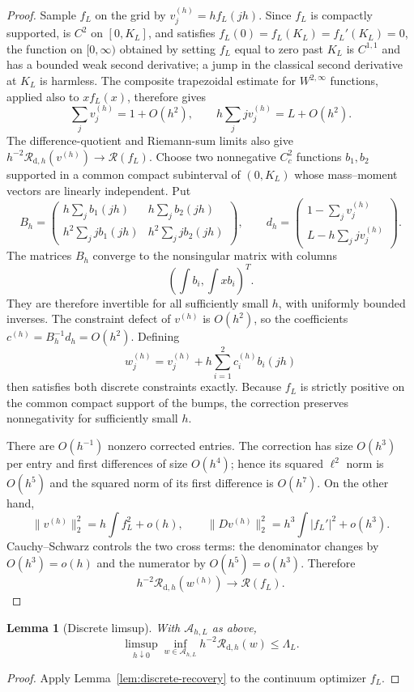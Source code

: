 \documentclass[11pt]{amsart}
\newtheorem{lemma}[theorem]{Lemma}
\theoremstyle{definition}
\theoremstyle{remark}
\newcommand{\Rcal}{\mathcal R}
\begin{document}
\begin{proof}
Sample $f_L$ on the grid by $v_j^{(h)}=h f_L(jh)$. Since $f_L$ is compactly
supported, is $C^2$ on $[0,K_L]$, and satisfies
$f_L(0)=f_L(K_L)=f_L'(K_L)=0$, the function on $[0,\infty)$ obtained by
setting $f_L$ equal to zero past $K_L$ is $C^{1,1}$ and has a bounded weak
second derivative; a jump in the classical second derivative at $K_L$ is
harmless. The composite trapezoidal estimate for
$W^{2,\infty}$ functions, applied also to $x f_L(x)$, therefore gives
\[
 \sum_jv_j^{(h)}=1+O(h^2),\qquad
 h\sum_jjv_j^{(h)}=L+O(h^2).
\]
The difference-quotient and Riemann-sum limits also give
$h^{-2}\Rcal_{\mathrm d,h}(v^{(h)})\to\Rcal(f_L)$. Choose two nonnegative
$C_c^2$ functions $b_1,b_2$ supported in a common compact subinterval of
$(0,K_L)$ whose mass--moment vectors are linearly independent. Put
\[
 B_h=\begin{pmatrix}
 h\sum_jb_1(jh)&h\sum_jb_2(jh)\\
 h^2\sum_jj b_1(jh)&h^2\sum_jj b_2(jh)
 \end{pmatrix},
 \qquad
 d_h=\begin{pmatrix}
 1-\sum_jv_j^{(h)}\\[2pt]
 L-h\sum_jjv_j^{(h)}
 \end{pmatrix}.
\]
The matrices $B_h$ converge to the nonsingular matrix with columns
\[
 (\int b_i,\int xb_i)^T.
\]
They are therefore invertible for all sufficiently
 small $h$, with uniformly bounded inverses. The constraint defect of
 $v^{(h)}$ is $O(h^2)$, so the coefficients
$c^{(h)}=B_h^{-1}d_h=O(h^2)$. Defining
\[
 w_j^{(h)}=v_j^{(h)}+h\sum_{i=1}^2 c_i^{(h)}b_i(jh)
\]
then satisfies both discrete constraints exactly. Because $f_L$ is strictly
positive on the common compact support of the bumps, the correction preserves
nonnegativity for sufficiently small $h$.

There are $O(h^{-1})$ nonzero corrected entries. The correction has size
$O(h^3)$ per entry and first differences of size $O(h^4)$; hence its squared
$\ell^2$ norm is $O(h^5)$ and the squared norm of its first difference is
$O(h^7)$. On the other hand,
\[
 \|v^{(h)}\|_2^2=h\int f_L^2+o(h),
 \qquad
 \|Dv^{(h)}\|_2^2=h^3\int |f_L'|^2+o(h^3).
\]
Cauchy--Schwarz controls the two cross terms: the denominator changes by
$O(h^3)=o(h)$ and the numerator by $O(h^5)=o(h^3)$.
Therefore
\[
 h^{-2}\Rcal_{\mathrm d,h}(w^{(h)})\to\Rcal(f_L).
\]
\end{proof}

\begin{lemma}[Discrete limsup]\label{lem:discrete-limsup}
With $\mathcal A_{h,L}$ as above,
\[
 \limsup_{h\downarrow0}\inf_{w\in\mathcal A_{h,L}}
 h^{-2}\Rcal_{\mathrm d,h}(w)\leq\Lambda_L.
\]
\end{lemma}
\begin{proof}
Apply Lemma~\ref{lem:discrete-recovery} to the continuum optimizer $f_L$.
\end{proof}
\end{document}
